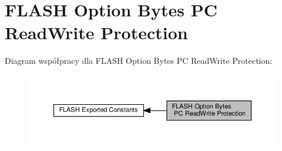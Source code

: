 \hypertarget{group___f_l_a_s_h_ex___option___bytes___p_c___read_write___protection}{}\section{F\+L\+A\+SH Option Bytes PC Read\+Write Protection}
\label{group___f_l_a_s_h_ex___option___bytes___p_c___read_write___protection}
Diagram współpracy dla F\+L\+A\+SH Option Bytes PC Read\+Write Protection\+:\nopagebreak
\begin{figure}[H]
\begin{center}
\leavevmode
\includegraphics[width=350pt]{group___f_l_a_s_h_ex___option___bytes___p_c___read_write___protection}
\end{center}
\end{figure}
